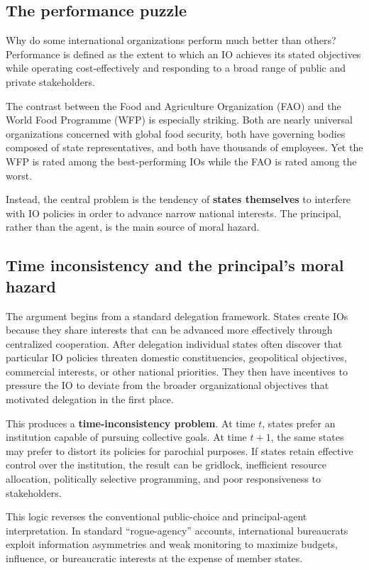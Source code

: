 \subsection{The performance puzzle}

Why do some international organizations perform much better than others? Performance is defined as the extent to which an IO achieves its stated objectives while operating cost-effectively and responding to a broad range of public and private stakeholders.

The contrast between the Food and Agriculture Organization (FAO) and the World Food Programme (WFP) is especially striking. Both are nearly universal organizations concerned with global food security, both have governing bodies composed of state representatives, and both have thousands of employees. Yet the WFP is rated among the best-performing IOs while the FAO is rated among the worst.

Instead, the central problem is the tendency of \textbf{states themselves} to interfere with IO policies in order to advance narrow national interests. The principal, rather than the agent, is the main source of moral hazard.

\subsection{Time inconsistency and the principal's moral hazard}

The argument begins from a standard delegation framework. States create IOs because they share interests that can be advanced more effectively through centralized cooperation. After delegation individual states often discover that particular IO policies threaten domestic constituencies, geopolitical objectives, commercial interests, or other national priorities. They then have incentives to pressure the IO to deviate from the broader organizational objectives that motivated delegation in the first place.

This produces a \textbf{time-inconsistency problem}. At time $t$, states prefer an institution capable of pursuing collective goals. At time $t+1$, the same states may prefer to distort its policies for parochial purposes. If states retain effective control over the institution, the result can be gridlock, inefficient resource allocation, politically selective programming, and poor responsiveness to stakeholders.

This logic reverses the conventional public-choice and principal-agent interpretation. In standard ``rogue-agency'' accounts, international bureaucrats exploit information asymmetries and weak monitoring to maximize budgets, influence, or bureaucratic interests at the expense of member states.

